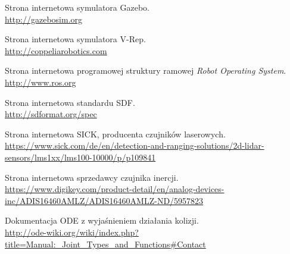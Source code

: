 \begin{thebibliography}{0}
Strona internetowa symulatora Gazebo. \\
\url{http://gazebosim.org}

Strona internetowa symulatora V-Rep. \\
\url{http://coppeliarobotics.com}

Strona internetowa programowej struktury ramowej \emph{Robot Operating System}. \\
\url{http://www.ros.org}

Strona internetowa standardu SDF. \\
\url{http://sdformat.org/spec}

Strona internetowa SICK, producenta czujników laserowych. \\
\url{https://www.sick.com/de/en/detection-and-ranging-solutions/2d-lidar-sensors/lms1xx/lms100-10000/p/p109841}

Strona internetowa sprzedawcy czujnika inercji. \\
\url{https://www.digikey.com/product-detail/en/analog-devices-inc/ADIS16460AMLZ/ADIS16460AMLZ-ND/5957823}

Dokumentacja ODE z wyjaśnieniem działania kolizji. \\
\url{http://ode-wiki.org/wiki/index.php?title=Manual:_Joint_Types_and_Functions#Contact}

\end{thebibliography}
